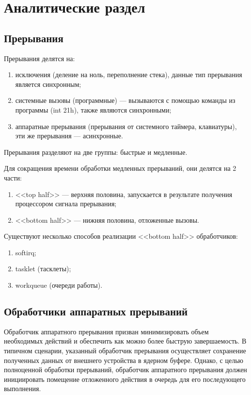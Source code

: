 \section{\large Аналитические раздел}

\subsection{Прерывания}

Прерывания делятся на:

\begin{enumerate}
    \item исключения (деление на ноль, переполнение стека), данные тип прерывания является синхронным;
    \item системные вызовы (программные) --- вызываются с помощью команды из программы (int 21h), также являются синхронными;
    \item аппаратные прерывания (прерывания от системного таймера, клавиатуры), эти же прерывания --- асинхронные.
\end{enumerate}

Прерывания разделяют на две группы: быстрые и медленные.

Для сокращения времени обработки медленных прерываний, они делятся на 2 части:

\begin{enumerate}
    \item <<top half>> --- верхняя половина, запускается в результате получения процессором сигнала прерывания;
    \item <<bottom half>> --- нижняя половина, отложенные вызовы.
\end{enumerate}

Существуют несколько способов реализации <<bottom half>> обработчиков:

\begin{enumerate}
    \item softirq;
    \item tasklet (тасклеты);
    \item workqueue (очереди работы).
\end{enumerate}

\subsection{Обработчики аппаратных прерываний}

Обработчик аппаратного прерывания призван минимизировать объем необходимых действий и обеспечить как можно более быструю завершаемость.
В типичном сценарии, указанный обработчик прерывания осуществляет сохранение полученных данных от внешнего устройства в ядерном буфере.
Однако, с целью полноценной обработки прерываний, обработчик аппаратного прерывания должен инициировать помещение отложенного действия в очередь для его последующего выполнения.

